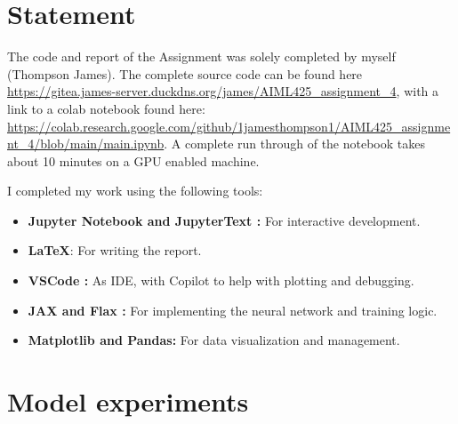 \documentclass[conference,a4paper]{IEEEtran}
\begin{document}
\newpage
\section*{Statement}

The code and report of the Assignment was solely completed by myself (Thompson James). The complete source code can be found here \url{https://gitea.james-server.duckdns.org/james/AIML425\_assignment\_4}, with a link to a colab notebook found here: \url{https://colab.research.google.com/github/1jamesthompson1/AIML425_assignment_4/blob/main/main.ipynb}. A complete run through of the notebook takes about 10 minutes on a GPU enabled machine.


I completed my work using the following tools:
\begin{itemize}
    \item \textbf{Jupyter Notebook \cite{Kluyver2016jupyter} and JupyterText \cite{woutsMwoutsJupytext2025}:} For interactive development.
    \item \textbf{\LaTeX}: For writing the report.
    \item \textbf{VSCode \cite{MicrosoftVscode2025}:} As IDE, with Copilot to help with plotting and debugging.
    \item \textbf{JAX \cite{jax2018github} and Flax \cite{flax2020github}:} For implementing the neural network and training logic.
    \item \textbf{Matplotlib\cite{Hunter:2007} and Pandas\cite{thepandasdevelopmentteamPandasdevPandasPandas}:} For data visualization and management.
\end{itemize}





\appendix

\section{Model experiments}
\end{document}

